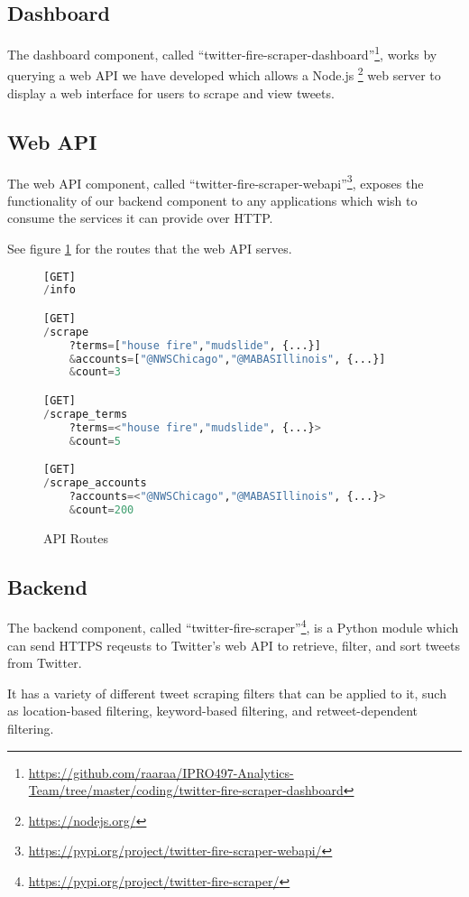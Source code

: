 \documentclass{article}
\begin{document}
\subsection{Dashboard}

The dashboard component, called ``twitter-fire-scraper-dashboard''\footnote{\url{https://github.com/raaraa/IPRO497-Analytics-Team/tree/master/coding/twitter-fire-scraper-dashboard}}, works by querying a web API we have developed which allows a Node.js \footnote{\url{https://nodejs.org/}} web server to display a web interface for users to scrape and view tweets.

\subsection{Web API}

The web API component, called ``twitter-fire-scraper-webapi''\footnote{\url{https://pypi.org/project/twitter-fire-scraper-webapi/}}, exposes the functionality of our backend component to any applications which wish to consume the services it can provide over HTTP.

See figure \ref{fig:api_routes} for the routes that the web API serves.

\begin{figure}[H]
    \centering
    \begin{lstlisting}[language=Python]
[GET]
/info

[GET]
/scrape
    ?terms=["house fire","mudslide", {...}]
    &accounts=["@NWSChicago","@MABASIllinois", {...}]
    &count=3

[GET]
/scrape_terms
    ?terms=<"house fire","mudslide", {...}>
    &count=5

[GET]
/scrape_accounts
    ?accounts=<"@NWSChicago","@MABASIllinois", {...}>
    &count=200
    \end{lstlisting}
    \caption{API Routes}
    \label{fig:api_routes}
\end{figure}

\subsection{Backend}

The backend component, called ``twitter-fire-scraper''\footnote{\url{https://pypi.org/project/twitter-fire-scraper/}}, is a Python module which can send HTTPS reqeusts to Twitter's web API to retrieve, filter, and sort tweets from Twitter.

It has a variety of different tweet scraping filters that can be applied to it, such as location-based filtering, keyword-based filtering, and retweet-dependent filtering.
\end{document}
